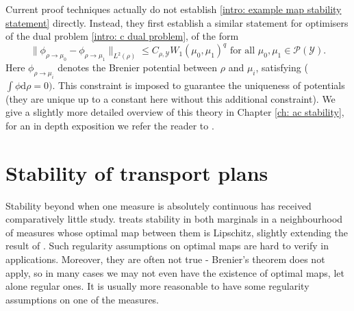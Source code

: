 \documentclass[11pt, oneside, titlepage]{book}
\theoremstyle{plain}
\theoremstyle{definition}
\newcommand{\Y}{\mathcal{Y}}
\newcommand{\di}{\mathrm{d}}
\begin{document}
Current proof techniques actually do not establish \eqref{intro: example map stability statement} directly. Instead, they first establish a similar statement for optimisers of the dual problem \eqref{intro: c dual problem}, of the form
\begin{equation}
\label{intro: example potential stability statement}
    \|\phi_{\rho \to \mu_0} - \phi_{\rho \to \mu_1} \|_{L^2(\rho)} \leq C_{\rho, \Y} W_1(\mu_0, \mu_1)^{q} \text{ for all } \mu_0, \mu_1 \in \mathcal{P}(\Y).
\end{equation}
Here $\phi_{\rho \to \mu_i}$ denotes the Brenier potential between $\rho$ and $\mu_i$, satisfying ($\int \phi \di \rho = 0)$. This constraint is imposed to guarantee the uniqueness of potentials (they are unique up to a constant here without this additional constraint). We give a slightly more detailed overview of this theory in Chapter \ref{ch: ac stability}, for an in depth exposition we refer the reader to \cite{letrouit2025lectures}.


\section{Stability of transport plans}


Stability beyond when one measure is absolutely continuous has received comparatively little study. \cite{li2021quantitative} treats stability in both marginals in a neighbourhood of measures whose optimal map between them is Lipschitz, slightly extending the result of \cite{gigli2011holder}. Such regularity assumptions on optimal maps are hard to verify in applications. Moreover, they are often not true - Brenier's theorem does not apply, so in many cases we may not even have the existence of optimal maps, let alone regular ones. It is usually more reasonable to have some regularity assumptions on one of the measures.
\end{document}
